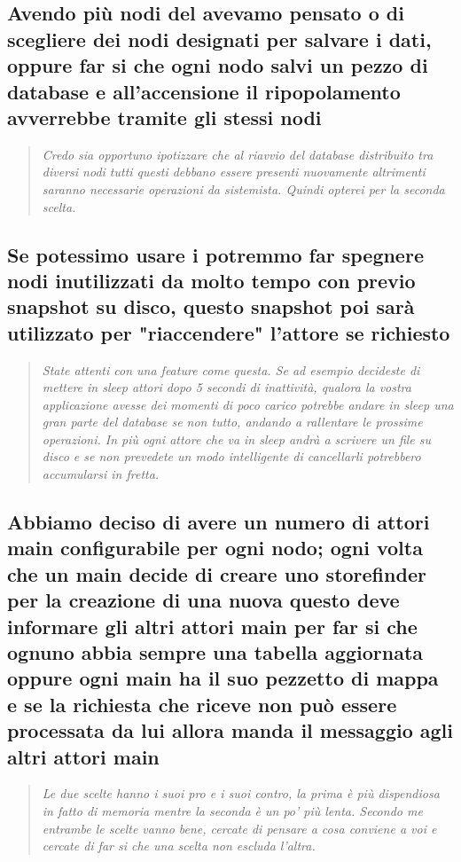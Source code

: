 \documentclass{scalatekids-article}
\begin{document}
\subsection{Avendo più nodi del  avevamo pensato o di scegliere dei nodi designati per salvare i dati, oppure far si che ogni nodo salvi un pezzo di database e all'accensione il ripopolamento avverrebbe tramite gli stessi nodi\\}
\begin{quote}
  \textit{Credo sia opportuno ipotizzare che al riavvio del database distribuito tra diversi nodi tutti questi debbano essere presenti nuovamente altrimenti saranno necessarie operazioni da sistemista. Quindi opterei per la seconda scelta.}
\end{quote}
\subsection{Se potessimo usare i  potremmo far spegnere nodi inutilizzati da molto tempo con previo snapshot su disco, questo snapshot poi sarà utilizzato per "riaccendere" l'attore se richiesto\\}
\begin{quote}
  \textit{State attenti con una feature come questa. Se ad esempio decideste di mettere in sleep attori dopo 5 secondi di inattività, qualora la vostra applicazione avesse dei momenti di poco carico potrebbe andare in sleep una gran parte del database se non tutto, andando a rallentare le prossime operazioni. In più ogni attore che va in sleep andrà a scrivere un file su disco e se non prevedete un modo intelligente di cancellarli potrebbero accumularsi in fretta.}
\end{quote}
\subsection{Abbiamo deciso di avere un numero di attori main configurabile per ogni nodo; ogni volta che un main decide di creare uno storefinder per la creazione di una nuova  questo deve informare gli altri attori main per far si che ognuno abbia sempre una tabella aggiornata oppure ogni main ha il suo pezzetto di mappa e se la richiesta che riceve non può essere processata da lui allora manda il messaggio agli altri attori main\\}
\begin{quote}
  \textit{Le due scelte hanno i suoi pro e i suoi contro, la prima è più dispendiosa in fatto di memoria mentre la seconda è un po' più lenta. Secondo me entrambe le scelte vanno bene, cercate di pensare a cosa conviene a voi e cercate di far si che una scelta non escluda l'altra.}
\end{quote}
\end{document}
